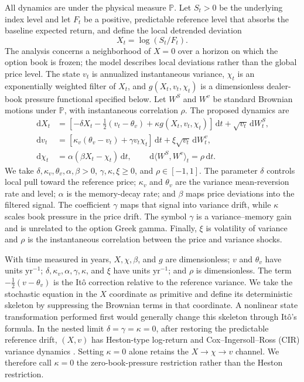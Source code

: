 \documentclass[11pt]{article}
\newcommand{\dd}{\,\mathrm{d}}
\begin{document}
All dynamics are under the physical measure $\mathbb P$.  Let $S_t>0$ be the underlying
index level and let $F_t$ be a positive,
predictable reference level that absorbs the baseline expected return, and define the local
detrended deviation
\[
X_t=\log(S_t/F_t).
\]
The analysis concerns a neighborhood of $X=0$ over a horizon on which the option book is
frozen; the model describes local deviations rather than the global price level.  The state
$v_t$ is annualized
instantaneous variance, $\chi_t$ is an exponentially weighted filter of $X_t$, and
$g(X_t,v_t,\chi_t)$ is a dimensionless dealer-book pressure functional specified below.
Let $W^S$ and $W^v$ be standard Brownian motions under $\mathbb P$, with instantaneous
correlation $\rho$.  The proposed dynamics are
\begin{align}
\dd X_t &={\left[-\delta X_t-\tfrac12(v_t-\theta_v)
                 +\kappa g(X_t,v_t,\chi_t)\right]}\dd t
          +\sqrt{v_t}\dd W_t^S, \label{eq:x-sde}\\
\dd v_t &={\left[\kappa_v(\theta_v-v_t)+\gamma v_t\chi_t\right]}\dd t
          +\xi\sqrt{v_t}\dd W_t^v, \label{eq:v-sde}\\
\dd\chi_t &=\alpha(\beta X_t-\chi_t)\dd t,
\qquad \dd\langle W^S,W^v\rangle_t=\rho\dd t. \label{eq:chi-sde}
\end{align}
We take $\delta,\kappa_v,\theta_v,\alpha,\beta>0$,
$\gamma,\kappa,\xi\geq0$, and $\rho\in[-1,1]$.
The parameter $\delta$ controls local pull toward the reference price; $\kappa_v$ and
$\theta_v$ are the variance mean-reversion rate and level; $\alpha$ is the memory-decay
rate; and $\beta$ maps price deviations into the filtered signal.  The coefficient $\gamma$
maps that signal into variance drift, while $\kappa$ scales book pressure in the price drift.
The symbol $\gamma$ is a variance--memory gain and is unrelated to the option Greek gamma.
Finally, $\xi$ is volatility of variance and $\rho$ is the instantaneous correlation between
the price and variance shocks.

With time measured in years, $X,\chi,\beta$, and $g$ are dimensionless; $v$ and $\theta_v$
have units $\mathrm{yr}^{-1}$; $\delta,\kappa_v,\alpha,\gamma,\kappa$, and $\xi$ have units
$\mathrm{yr}^{-1}$; and $\rho$ is dimensionless.  The term
$-\tfrac12(v-\theta_v)$ is the It\^o correction relative to the reference variance.
We take the stochastic equation in the $X$ coordinate as primitive and define its
deterministic skeleton by suppressing the Brownian terms in that coordinate.  A nonlinear
state transformation performed first would generally change this skeleton through It\^o's
formula.  In the nested limit $\delta=\gamma=\kappa=0$, after restoring the
predictable reference drift, $(X,v)$ has Heston-type log-return and
Cox--Ingersoll--Ross (CIR) variance dynamics \citep{heston1993}.  Setting $\kappa=0$ alone
retains the $X\to\chi\to v$ channel.  We therefore call $\kappa=0$ the
zero-book-pressure restriction rather than the Heston restriction.
\end{document}
